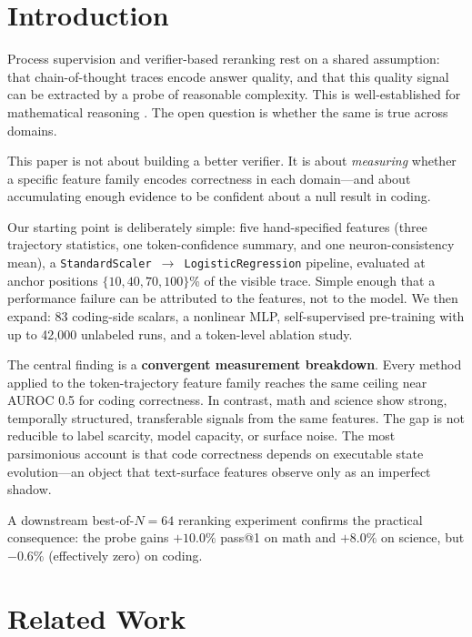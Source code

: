 \documentclass{article}
\begin{document}
\section{Introduction}

Process supervision and verifier-based reranking rest on a shared assumption: that chain-of-thought traces encode answer quality, and that this quality signal can be extracted by a probe of reasonable complexity. This is well-established for mathematical reasoning \citep{cobbe2021training,lightman2023verify,wang2024mathshepherd}. The open question is whether the same is true across domains.

This paper is not about building a better verifier. It is about \emph{measuring} whether a specific feature family encodes correctness in each domain—and about accumulating enough evidence to be confident about a null result in coding.

Our starting point is deliberately simple: five hand-specified features (three trajectory statistics, one token-confidence summary, and one neuron-consistency mean), a \texttt{StandardScaler $\to$ LogisticRegression} pipeline, evaluated at anchor positions $\{10, 40, 70, 100\}$\% of the visible trace. Simple enough that a performance failure can be attributed to the features, not to the model. We then expand: 83 coding-side scalars, a nonlinear MLP, self-supervised pre-training with up to 42,000 unlabeled runs, and a token-level ablation study.

The central finding is a \textbf{convergent measurement breakdown}. Every method applied to the token-trajectory feature family reaches the same ceiling near AUROC 0.5 for coding correctness. In contrast, math and science show strong, temporally structured, transferable signals from the same features. The gap is not reducible to label scarcity, model capacity, or surface noise. The most parsimonious account is that code correctness depends on executable state evolution—an object that text-surface features observe only as an imperfect shadow.

A downstream best-of-$N=64$ reranking experiment confirms the practical consequence: the probe gains $+10.0\%$ pass@1 on math and $+8.0\%$ on science, but $-0.6\%$ (effectively zero) on coding.

\section{Related Work}
\end{document}
